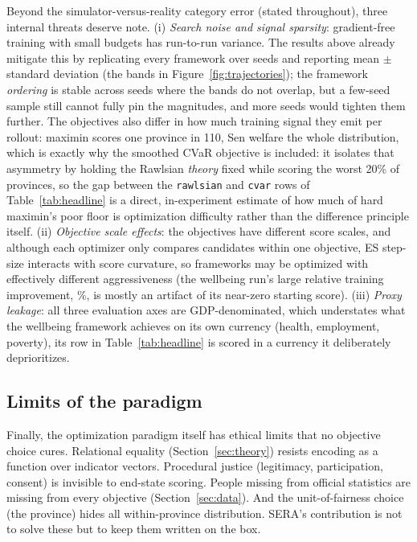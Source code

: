 \documentclass[11pt,a4paper]{article}
\newcommand{\code}[1]{\texttt{#1}}
\begin{document}
Beyond the simulator-versus-reality category error (stated throughout), three
internal threats deserve note. (i) \emph{Search noise and signal sparsity}:
gradient-free training with small budgets has run-to-run variance. The results
above already mitigate this by replicating every framework over \cmpSeeds{}
seeds and reporting mean $\pm$ standard deviation (the bands in
Figure~\ref{fig:trajectories}); the framework \emph{ordering} is stable across
seeds where the bands do not overlap, but a few-seed sample still cannot fully
pin the magnitudes, and more seeds would tighten them further. The objectives
also differ in how much training signal they emit per rollout: maximin
scores one province in 110, Sen welfare the whole distribution, which is
exactly why the smoothed CVaR objective is included: it isolates that
asymmetry by holding the Rawlsian \emph{theory} fixed while scoring the worst
20\% of provinces, so the gap between the \code{rawlsian} and \code{cvar} rows
of Table~\ref{tab:headline} is a direct, in-experiment estimate of how much of
hard maximin's poor floor is optimization difficulty rather than the
difference principle itself. (ii) \emph{Objective scale effects}: the objectives have
different score scales, and although each optimizer only compares candidates
within one objective, ES step-size interacts with score curvature, so
frameworks may be optimized with effectively different aggressiveness (the
wellbeing run's large relative training improvement, \cmpWellTrainImpr\%, is
mostly an artifact of its near-zero starting score). (iii) \emph{Proxy
leakage}: all three evaluation axes are GDP-denominated, which understates
what the wellbeing framework achieves on its own currency (health,
employment, poverty), its row in Table~\ref{tab:headline} is scored in a
currency it deliberately deprioritizes.

\subsection{Limits of the paradigm}

Finally, the optimization paradigm itself has ethical limits that no objective
choice cures. Relational equality (Section~\ref{sec:theory}) resists encoding
as a function over indicator vectors. Procedural justice (legitimacy,
participation, consent) is invisible to end-state scoring. People missing
from official statistics are missing from every objective
(Section~\ref{sec:data}). And the unit-of-fairness choice (the province)
hides all within-province distribution. SERA's contribution is not to solve
these but to keep them written on the box.
\end{document}
